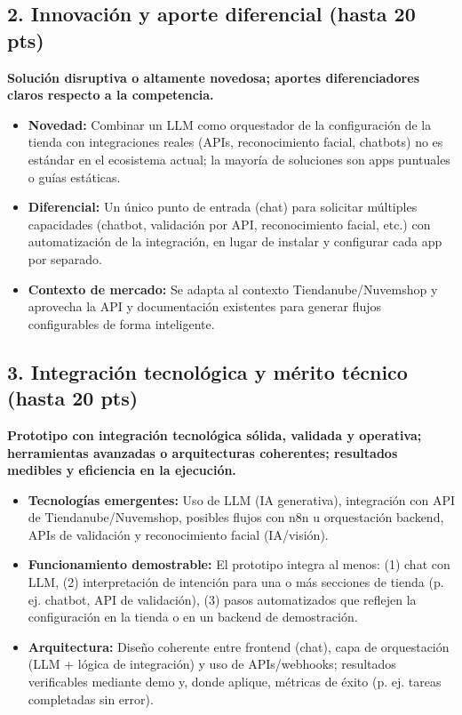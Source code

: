 \documentclass[9pt,a4paper,twocolumn,twoside]{rho-class/rho}
\begin{document}
\subsection{2. Innovación y aporte diferencial (hasta 20 pts)}

\textbf{Solución disruptiva o altamente novedosa; aportes diferenciadores claros respecto a la competencia.}

\begin{itemize}
    \item \textbf{Novedad:} Combinar un LLM como orquestador de la configuración de la tienda con integraciones reales (APIs, reconocimiento facial, chatbots) no es estándar en el ecosistema actual; la mayoría de soluciones son apps puntuales o guías estáticas.
    \item \textbf{Diferencial:} Un único punto de entrada (chat) para solicitar múltiples capacidades (chatbot, validación por API, reconocimiento facial, etc.) con automatización de la integración, en lugar de instalar y configurar cada app por separado.
    \item \textbf{Contexto de mercado:} Se adapta al contexto Tiendanube/Nuvemshop y aprovecha la API y documentación existentes para generar flujos configurables de forma inteligente.
\end{itemize}

\subsection{3. Integración tecnológica y mérito técnico (hasta 20 pts)}

\textbf{Prototipo con integración tecnológica sólida, validada y operativa; herramientas avanzadas o arquitecturas coherentes; resultados medibles y eficiencia en la ejecución.}

\begin{itemize}
    \item \textbf{Tecnologías emergentes:} Uso de LLM (IA generativa), integración con API de Tiendanube/Nuvemshop, posibles flujos con n8n u orquestación backend, APIs de validación y reconocimiento facial (IA/visión).
    \item \textbf{Funcionamiento demostrable:} El prototipo integra al menos: (1) chat con LLM, (2) interpretación de intención para una o más secciones de tienda (p. ej. chatbot, API de validación), (3) pasos automatizados que reflejen la configuración en la tienda o en un backend de demostración.
    \item \textbf{Arquitectura:} Diseño coherente entre frontend (chat), capa de orquestación (LLM + lógica de integración) y uso de APIs/webhooks; resultados verificables mediante demo y, donde aplique, métricas de éxito (p. ej. tareas completadas sin error).
\end{itemize}
\end{document}
